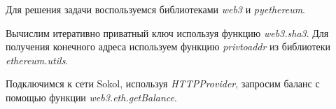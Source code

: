 \solutionSection

Для решения задачи воспользуемся библиотеками \textit{web3} и \textit{pyethereum}.

Вычислим итеративно приватный ключ используя функцию \textit{web3.sha3}. Для получения конечного адреса используем функцию \textit{privtoaddr} из библиотеки \textit{ethereum.utils}.

Подключимся к сети Sokol, используя \textit{HTTPProvider}, запросим баланс с помощью функции \textit{web3.eth.getBalance}.

\codeExample

